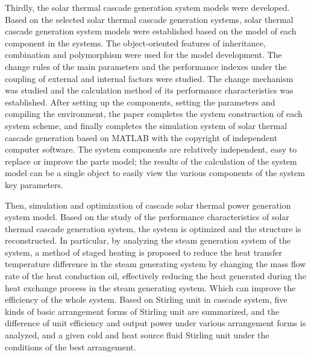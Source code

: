 {Thirdly, the solar thermal cascade generation system models were developed. Based on the selected solar thermal cascade generation systems, solar thermal cascade generation system models were established based on the model of each component in the systems. The object-oriented features of inheritance, combination and polymorphism were used for the model development. The change rules of the main parameters and the performance indexes under the coupling of external and internal factors were studied. The change mechanism was studied and the calculation method of its performance characteristics was established. After setting up the components, setting the parameters and compiling the environment, the paper completes the system construction of each system scheme, and finally completes the simulation system of solar thermal cascade generation based on MATLAB with the copyright of independent computer software. The system components are relatively independent, easy to replace or improve the parts model; the results of the calculation of the system model can be a single object to easily view the various components of the system key parameters.

Then, simulation and optimization of cascade solar thermal power generation system model. Based on the study of the performance characteristics of solar thermal cascade generation system, the system is optimized and the structure is reconstructed. In particular, by analyzing the steam generation system of the system, a method of staged heating is proposed to reduce the heat transfer temperature difference in the steam generating system by changing the mass flow rate of the heat conduction oil, effectively reducing the heat generated during the heat exchange process in the steam generating system. Which can improve the efficiency of the whole system. Based on Stirling unit in cascade system, five kinds of basic arrangement forms of Stirling unit are summarized, and the difference of unit efficiency and output power under various arrangement forms is analyzed, and a given cold and heat source fluid Stirling unit under the conditions of the best arrangement.

}
